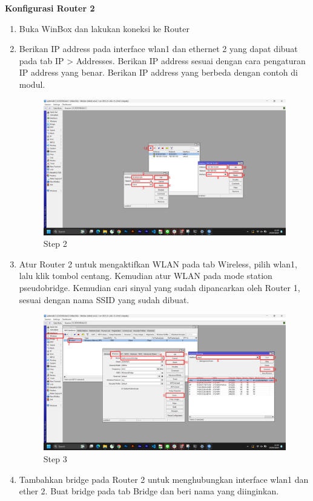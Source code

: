 \begin{center}
	\textbf{Konfigurasi Router 2}
	\begin{enumerate}
		\item Buka WinBox dan lakukan koneksi ke Router
		\item Berikan IP address pada interface wlan1 dan ethernet 2 yang dapat dibuat pada tab IP > Addresses. Berikan IP address sesuai dengan cara pengaturan IP address yang benar. Berikan IP address yang berbeda dengan contoh di modul.
		\begin{figure}[H]
			\centering
			\includegraphics[width=0.9\linewidth]{P1/img/per3/pc2/Step 2.png}
			\caption{Step 2}
			\label{fig:Step 2(Per.3 PC2)}
		\end{figure}
		\item Atur Router 2 untuk mengaktifkan WLAN pada tab Wireless, pilih wlan1, lalu klik tombol centang. Kemudian atur WLAN pada mode station pseudobridge. Kemudian cari sinyal yang sudah dipancarkan oleh Router 1, sesuai dengan nama SSID yang sudah dibuat.
		\begin{figure}[H]
			\centering
			\includegraphics[width=0.9\linewidth]{P1/img/per3/pc2/Step 3.png}
			\caption{Step 3}
			\label{fig:Step 3(Per.3 PC2)}
		\end{figure}
		\item Tambahkan bridge pada Router 2 untuk menghubungkan interface wlan1 dan ether 2. Buat bridge pada tab Bridge dan beri nama yang diinginkan.

\end{enumerate}
\end{center}
